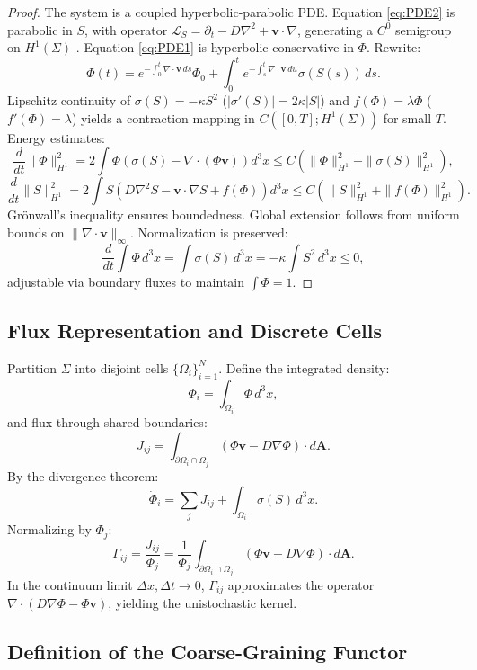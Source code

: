 \documentclass[12pt]{article}
\begin{document}
\begin{proof}
The system is a coupled hyperbolic-parabolic PDE. Equation \eqref{eq:PDE2} is parabolic in \(S\), with operator \(\mathcal{L}_S = \partial_t - D \nabla^2 + \mathbf{v} \cdot \nabla\), generating a \(C^0\) semigroup on \(H^1(\Sigma)\) \citep{Risken1996}. Equation \eqref{eq:PDE1} is hyperbolic-conservative in \(\Phi\). Rewrite:
\[
\Phi(t) = e^{-\int_0^t \nabla \cdot \mathbf{v} \, ds} \Phi_0 + \int_0^t e^{-\int_s^t \nabla \cdot \mathbf{v} \, du} \sigma(S(s)) \, ds.
\]
Lipschitz continuity of \(\sigma(S) = -\kappa S^2\) (\(|\sigma'(S)| = 2 \kappa |S|\)) and \(f(\Phi) = \lambda \Phi\) (\(f'(\Phi) = \lambda\)) yields a contraction mapping in \(C([0, T]; H^1(\Sigma))\) for small \(T\). Energy estimates:
\[
\frac{d}{dt} \|\Phi\|_{H^1}^2 = 2 \int \Phi \left( \sigma(S) - \nabla \cdot (\Phi \mathbf{v}) \right) d^3x \leq C (\|\Phi\|_{H^1}^2 + \|\sigma(S)\|_{H^1}^2),
\]
\[
\frac{d}{dt} \|S\|_{H^1}^2 = 2 \int S \left( D \nabla^2 S - \mathbf{v} \cdot \nabla S + f(\Phi) \right) d^3x \leq C (\|S\|_{H^1}^2 + \|f(\Phi)\|_{H^1}^2).
\]
Grönwall’s inequality ensures boundedness. Global extension follows from uniform bounds on \(\|\nabla \cdot \mathbf{v}\|_\infty\). Normalization is preserved:
\[
\frac{d}{dt} \int \Phi \, d^3x = \int \sigma(S) \, d^3x = -\kappa \int S^2 \, d^3x \leq 0,
\]
adjustable via boundary fluxes to maintain \(\int \Phi = 1\).
\end{proof}

\subsection{Flux Representation and Discrete Cells}

Partition \(\Sigma\) into disjoint cells \(\{\Omega_i\}_{i=1}^N\). Define the integrated density:
\[
\Phi_i = \int_{\Omega_i} \Phi \, d^3x,
\]
and flux through shared boundaries:
\[
J_{ij} = \int_{\partial \Omega_i \cap \Omega_j} (\Phi \mathbf{v} - D \nabla \Phi) \cdot d\mathbf{A}.
\]
By the divergence theorem:
\[
\dot{\Phi}_i = \sum_j J_{ij} + \int_{\Omega_i} \sigma(S) \, d^3x.
\]
Normalizing by \(\Phi_j\):
\[
\Gamma_{ij} = \frac{J_{ij}}{\Phi_j} = \frac{1}{\Phi_j} \int_{\partial \Omega_i \cap \Omega_j} (\Phi \mathbf{v} - D \nabla \Phi) \cdot d\mathbf{A}.
\]
In the continuum limit \(\Delta x, \Delta t \to 0\), \(\Gamma_{ij}\) approximates the operator \(\nabla \cdot (D \nabla \Phi - \Phi \mathbf{v})\), yielding the unistochastic kernel.

\subsection{Definition of the Coarse-Graining Functor}
\end{document}
